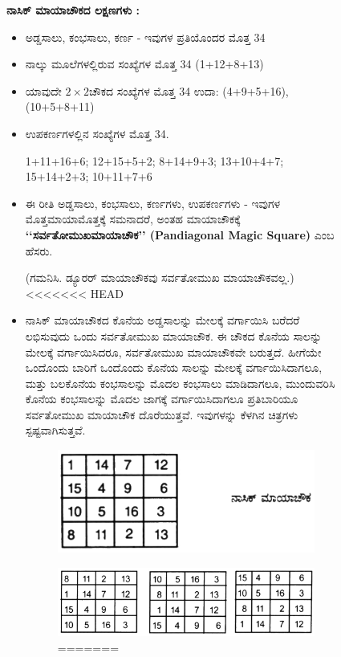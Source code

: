 \begin{figure}[H]
\textbf{ನಾಸಿಕ್ ಮಾಯಾಚೌಕದ ಲಕ್ಷಣಗಳು :}

\begin{itemize}
	\item ಅಡ್ಡಸಾಲು, ಕಂಭಸಾಲು, ಕರ್ಣ - ಇವುಗಳ ಪ್ರತಿಯೊಂದರ ಮೊತ್ತ 34
	\item ನಾಲ್ಕು ಮೂಲೆಗಳಲ್ಲಿರುವ ಸಂಖ್ಯೆಗಳ ಮೊತ್ತ 34 (1+12+8+13)
	\item ಯಾವುದೇ $2 \times 2$ಚೌಕದ ಸಂಖ್ಯೆಗಳ ಮೊತ್ತ 34 ಉದಾ: (4+9+5+16), (10+5+8+11)
	\item ಉಪಕರ್ಣಗಳಲ್ಲಿನ ಸಂಖ್ಯೆಗಳ ಮೊತ್ತ 34.

	1+11+16+6; 12+15+5+2; 8+14+9+3; 13+10+4+7; 15+14+2+3; 10+11+7+6
	\item ಈ ರೀತಿ ಅಡ್ಡಸಾಲು, ಕಂಭಸಾಲು, ಕರ್ಣಗಳು, ಉಪಕರ್ಣಗಳು - ಇವುಗಳ ಮೊತ್ತ\break ಮಾಯಾಮೊತ್ತಕ್ಕೆ ಸಮನಾದರೆ, ಅಂತಹ ಮಾಯಾಚೌಕಕ್ಕೆ  \textbf{‘‘ಸರ್ವತೋಮುಖ\break ಮಾಯಾಚೌಕ’’ (Pandiagonal Magic Square)} ಎಂಬ ಹೆಸರು.

	(ಗಮನಿಸಿ. ಡ್ಯೂರರ್ ಮಾಯಾಚೌಕವು ಸರ್ವತೋಮುಖ ಮಾಯಾಚೌಕವಲ್ಲ.)
<<<<<<< HEAD
	\item ನಾಸಿಕ್ ಮಾಯಾಚೌಕದ ಕೊನೆಯ ಅಡ್ಡಸಾಲನ್ನು ಮೇಲಕ್ಕೆ ವರ್ಗಾಯಿಸಿ ಬರೆದರೆ ಲಭಿಸುವುದು ಒಂದು ಸರ್ವತೋಮುಖ ಮಾಯಾಚೌಕ. ಈ ಚೌಕದ ಕೊನೆಯ ಸಾಲನ್ನು ಮೇಲಕ್ಕೆ ವರ್ಗಾಯಿಸಿದರೂ, ಸರ್ವತೋಮುಖ ಮಾಯಾಚೌಕವೇ ಬರುತ್ತದೆ. ಹೀಗೆಯೇ ಒಂದೊಂದು ಬಾರಿಗೆ ಒಂದೊಂದು ಕೊನೆಯ ಸಾಲನ್ನು ಮೇಲಕ್ಕೆ ವರ್ಗಾಯಿಸಿದಾಗಲೂ, ಮತ್ತು ಬಲಕೊನೆಯ ಕಂಭಸಾಲನ್ನು ಮೊದಲ ಕಂಭಸಾಲು ಮಾಡಿದಾಗಲೂ, ಮುಂದುವರಿಸಿ ಕೊನೆಯ ಕಂಭಸಾಲನ್ನು ಮೊದಲ ಜಾಗಕ್ಕೆ ವರ್ಗಾಯಿಸಿದಾಗಲೂ ಪ್ರತಿಬಾರಿಯೂ ಸರ್ವತೋಮುಖ ಮಾಯಾಚೌಕ ದೊರೆಯುತ್ತವೆ. ಇವುಗಳನ್ನು ಕೆಳಗಿನ ಚಿತ್ರಗಳು ಸ್ಪಷ್ಟವಾಗಿಸುತ್ತವೆ.
	\begin{figure}[H]
	\includegraphics[scale=.8]{src/figures/chap4/fig4-3.jpg}
	\end{figure}
	\begin{figure}[H]
	\includegraphics[scale=.8]{src/figures/chap4/fig4-4.jpg}
=======
	

\end{figure}
\end{itemize}
\end{figure}
